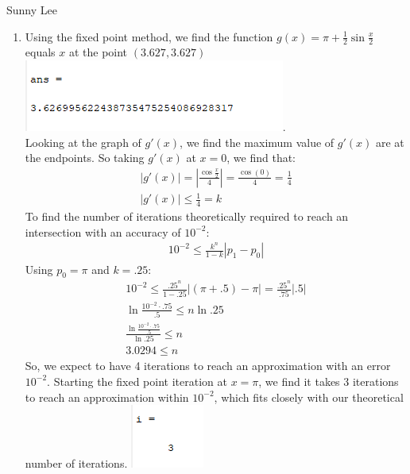 \documentclass[12pt,letterpaper]{article}
\begin{document}
Sunny Lee
\begin{enumerate}
    \item Using the fixed point method, we find the function 
    $g(x) = \pi + \frac{1}{2}\sin{\frac{x}{2}}$ equals $x$ at the point $(3.627, 3.627)$\\
    \includegraphics{number1.png}. \\
    Looking at the graph of $g\prime(x)$, we find the maximum value of $g\prime(x)$
    are at the endpoints. So taking $g\prime(x)$ at $x = 0$, we find that: 
    \begin{gather*}
      |g\prime(x)| = |\frac{\cos{\frac{x}{2}}}{4}| = \frac{\cos(0)}{4} = \frac{1}{4}\\
      |g\prime(x)| \leq \frac{1}{4} = k
    \end{gather*}
    To find the number of iterations theoretically required to reach an intersection 
    with an accuracy of $10^{-2}$: 
    \begin{gather*}
      10^{-2} \leq \frac{k^n}{1-k} |p_1 - p_0|
    \end{gather*}
    Using $p_0 = \pi$ and $k = .25$: 
    \begin{gather*}
      10^{-2} \leq \frac{.25^n}{1-.25} |(\pi + .5) - \pi| = \frac{.25^n}{.75} |.5|\\
      \ln{\frac{ 10^{-2} \cdot .75 }{.5}} \leq n\ln{.25}\\
      \frac{\ln{\frac{ 10^{-2} \cdot .75 }{.5}}}{\ln{.25}} \leq n\\
      3.0294 \leq n
    \end{gather*}
    So, we expect to have  4 iterations to reach an approximation with an error $10^{-2}$.
    Starting the fixed point iteration at $x = \pi$, we find it takes 3 iterations 
    to reach an approximation within $10^{-2}$, which fits closely with our 
    theoretical number of iterations. 
    \includegraphics{number1error.png}\\


\end{enumerate}
\end{document}
